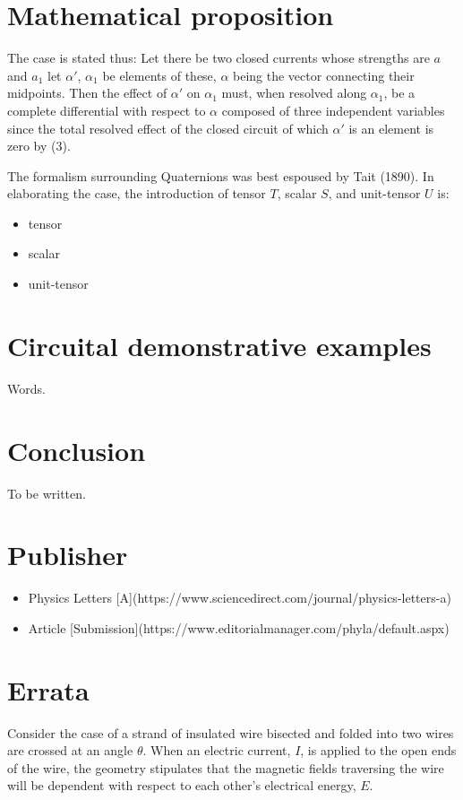 \documentclass[]{article}
\begin{document}
\section{Mathematical proposition}
The case is stated thus: Let there be two closed currents whose strengths are $a$ and $a_1$ let $\alpha\prime$, $\alpha_1$ be elements of these, $\alpha$ being the vector connecting their midpoints. Then the effect of $\alpha\prime$ on $\alpha_1$ must, when resolved along $\alpha_1$, be a complete differential with respect to $\alpha$ composed of three independent variables since the total resolved effect of the closed circuit of which $\alpha\prime$ is an element is zero by (3).

The formalism surrounding Quaternions was best espoused by Tait (1890). In elaborating the case, the introduction of tensor $T$, scalar $S$, and unit-tensor $U$ is:

\begin{itemize}
  \item tensor
  \item scalar
  \item unit-tensor
\end{itemize}

\section{Circuital demonstrative examples}
Words.

\section{Conclusion}
To be written.

\section{Publisher}
\begin{itemize}
  \item  Physics Letters [A](https://www.sciencedirect.com/journal/physics-letters-a)
  \item Article [Submission](https://www.editorialmanager.com/phyla/default.aspx)
\end{itemize}

\section{Errata}
Consider the case of a strand of insulated wire bisected and folded into two wires are crossed at an angle $\theta$. When an electric current, $I$, is applied to the open ends of the wire, the geometry stipulates that the magnetic fields traversing the wire will be dependent with respect to each other's electrical energy, $E$.
\end{document}
